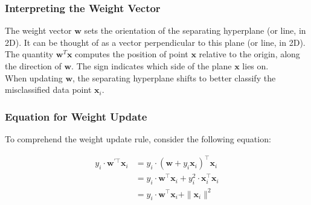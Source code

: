 \subsubsection{Interpreting the Weight Vector}
The weight vector $\mathbf{w}$ sets the orientation of the separating hyperplane (or line, in 2D). It can be thought of as a vector perpendicular to this plane (or line, in 2D). The quantity $\mathbf{w}^T\mathbf{x}$ computes the position of point $\mathbf{x}$ relative to the origin, along the direction of $\mathbf{w}$. The sign indicates which side of the plane $\mathbf{x}$ lies on.\\

\noindent
When updating $\mathbf{w}$, the separating hyperplane shifts to better classify the misclassified data point $\mathbf{x}_i$.

\subsubsection{Equation for Weight Update}
To comprehend the weight update rule, consider the following equation:

\begin{align*}
y_i\cdot\mathbf{w}^{\prime\top}\mathbf{x}_i &= y_i\cdot(\mathbf{w}+y_i\mathbf{x}_i)^\top\mathbf{x}_i \\
&= y_i\cdot\mathbf{w}^\top\mathbf{x}_i + y_i^2\cdot\mathbf{x}_i^\top\mathbf{x}_i \\
&= y_i\cdot\mathbf{w}^\top\mathbf{x}_i + \|\mathbf{x}_i\|^2
\end{align*}

